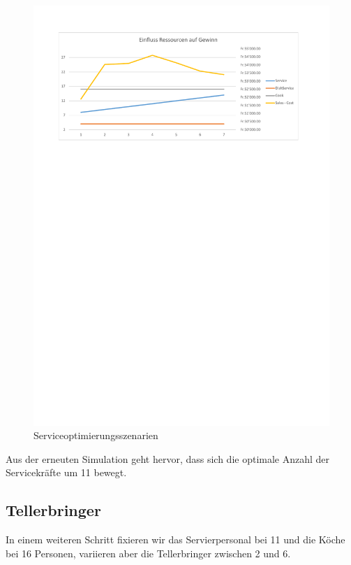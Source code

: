 \documentclass[ngerman,a4paper,12pt]{scrreprt}
\begin{document}
				\begin{figure}[H]
					\centering
						\includegraphics[trim=2cm 22.75cm 2.5cm 2cm, clip=true,width=\textwidth]{../Auswertung/2_Service.pdf}
						\caption[Serviceoptimierungsszenarien]{Serviceoptimierungsszenarien}
						\label{Serviceoptimierungsszenarien}
				\end{figure}
				
				Aus der erneuten Simulation geht hervor, dass sich die optimale Anzahl der Servicekräfte um 11 bewegt.
				
			\subsection{Tellerbringer}
				In einem weiteren Schritt fixieren wir das Servierpersonal bei 11 und die Köche bei 16 Personen, variieren aber die Tellerbringer zwischen 2 und 6.
				
\end{document}
